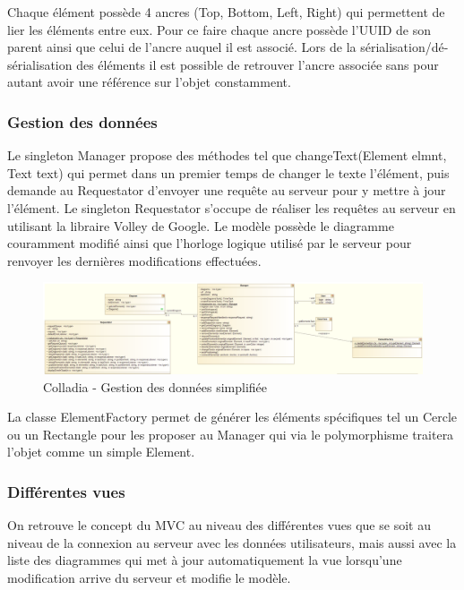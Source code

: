 Chaque élément possède 4 ancres (Top, Bottom, Left, Right) qui permettent de lier les éléments entre eux.
Pour ce faire chaque ancre possède l'UUID de son parent ainsi que celui de l'ancre auquel il est associé.
Lors de la sérialisation/dé-sérialisation des éléments il est possible de retrouver l'ancre associée sans pour autant avoir une référence sur l'objet constamment.
\vspace*{\fill}

\newpage
\subsubsection{Gestion des données}
Le singleton Manager propose des méthodes tel que changeText(Element elmnt, Text text) qui permet dans un premier temps de changer le texte l'élément, puis demande au Requestator d'envoyer une requête au serveur pour y mettre à jour l'élément.
Le singleton Requestator s'occupe de réaliser les requêtes au serveur en utilisant la libraire Volley de Google.
Le modèle possède le diagramme couramment modifié ainsi que l'horloge logique utilisé par le serveur pour renvoyer les dernières modifications effectuées.

	\begin{figure}[!h]
		\centering
		\includegraphics[width=\textwidth]{img/UmlArchiGeneral}
		\caption{Colladia - Gestion des données simplifiée}
	\end{figure}
	
La classe ElementFactory permet de générer les éléments spécifiques tel un Cercle ou un Rectangle pour les proposer au Manager qui via le polymorphisme traitera l'objet comme un simple Element.

\subsubsection{Différentes vues}
On retrouve le concept du MVC au niveau des différentes vues que se soit au niveau de la connexion au serveur avec les données utilisateurs, mais aussi avec la liste des diagrammes qui met à jour automatiquement la vue lorsqu'une modification arrive du serveur et modifie le modèle.

